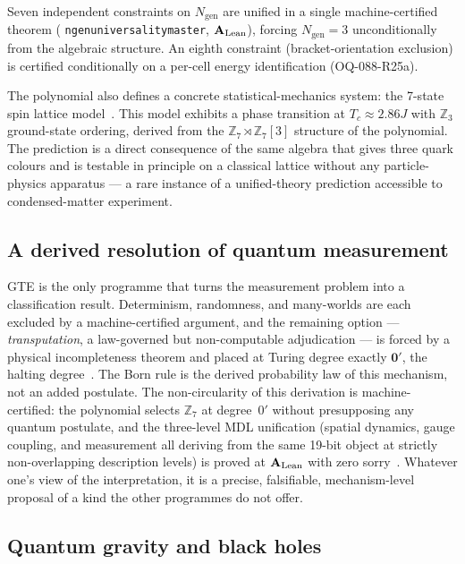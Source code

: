\documentclass[11pt]{article}
\newcommand{\GTE}{\text{GTE}}
\newcommand{\ZS}{\ensuremath{\mathbb{Z}_7}}
\newcommand{\Ngen}{\ensuremath{N_{\mathrm{gen}}}}
\newcommand{\lean}[1]{%
  \penalty-100
  \begingroup\def\_{\textunderscore\allowbreak}\texttt{#1}\endgroup}
\newcommand{\CatAL}{\ensuremath{\textbf{A}_{\rm Lean}}}
\begin{document}
Seven independent constraints on $\Ngen$ are unified in a single machine-certified
theorem (\lean{ngen\_universality\_master}, \CatAL), forcing $\Ngen = 3$
unconditionally from the \GTE{} algebraic structure.  An eighth constraint
(bracket-orientation exclusion) is certified conditionally on a per-cell energy
identification (OQ-088-R25a).

The polynomial also defines a concrete statistical-mechanics system: the 7-state
spin lattice model~\cite{SpivackSpin7Lattice}.  This model exhibits a
phase transition at $T_c \approx 2.86J$ with $\mathbb{Z}_3$ ground-state ordering,
derived from the $\ZS\rtimes\ZS[3]$ structure of the polynomial.  The prediction is
a direct consequence of the same algebra that gives three quark colours and is
testable in principle on a classical lattice without any particle-physics
apparatus --- a rare instance of a unified-theory prediction accessible to
condensed-matter experiment.

\subsection{A derived resolution of quantum measurement}

GTE is the only programme that turns the measurement problem into a classification
result.  Determinism, randomness, and many-worlds are each excluded by a
machine-certified argument, and the remaining option --- \emph{transputation}, a
law-governed but non-computable adjudication --- is forced by a physical
incompleteness theorem and placed at Turing degree exactly $\mathbf{0}'$, the
halting degree~\cite{SpivackPolynomialTransputation}.  The Born rule is the derived
probability law of this mechanism, not an added postulate.  The non-circularity of
this derivation is machine-certified: the polynomial selects $\ZS$ at degree~$0'$
without presupposing any quantum postulate, and the three-level MDL unification
(spatial dynamics, gauge coupling, and measurement all deriving from the same 19-bit
object at strictly non-overlapping description levels) is proved at \CatAL{}
with zero sorry~\cite{SpivackPolynomialTransputation}.  Whatever one's view of the
interpretation, it is a precise, falsifiable, mechanism-level proposal of a kind
the other programmes do not offer.

\subsection{Quantum gravity and black holes}
\end{document}
